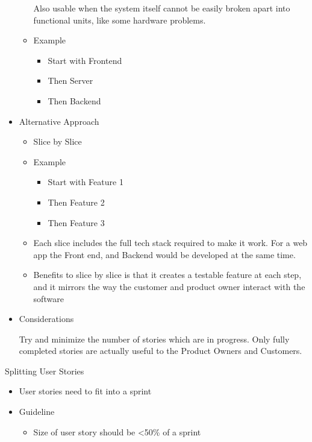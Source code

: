 \documentclass{report}
\begin{document}
\begin{description}
\begin{itemize}
\begin{itemize}
                        Also usable when the system itself cannot
                        be easily broken apart into functional units,
                        like some hardware problems.
                    \item Example
                        \begin{itemize}
                            \item Start with Frontend
                            \item Then Server
                            \item Then Backend
                        \end{itemize}
                \end{itemize}
                \pagebreak
            \item Alternative Approach
                \begin{itemize}
                    \item Slice by Slice
                    \item Example
                        \begin{itemize}
                            \item Start with Feature 1
                            \item Then Feature 2
                            \item Then Feature 3
                        \end{itemize}
                    \item Each slice includes the full tech
                        stack required to make it work. For
                        a web app the Front end, and Backend
                        would be developed at the same time.
                    \item Benefits to slice by slice is that
                        it creates a testable feature at each
                        step, and it mirrors the way the customer
                        and product owner interact with the software
                \end{itemize}
            \item Considerations

                Try and minimize the number of stories which
                are in progress. Only fully completed stories
                are actually useful to the Product Owners and
                Customers.
        \end{itemize}
    \item Splitting User Stories
        \begin{itemize}
            \item User stories need to fit into a sprint
            \item Guideline
                \begin{itemize}
                    \item Size of user story should be <50\%
                        of a sprint
                \end{itemize}
        \end{itemize}


\end{description}
\end{document}
